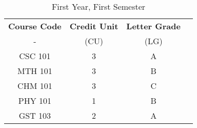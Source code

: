 \documentclass{article}
\begin{document}
	
	\begin{table}[h!]
		\begin{center}
			\caption{First Year, First Semester}
			\label{tab:table1}
			\begin{tabular}{c|c|c|c}
				\textbf{Course Code} & \textbf{Credit Unit} & 
				\textbf{Letter Grade}\\
				- & (CU) & (LG) \\
				\hline
				CSC 101 & 3 & A\\
			    MTH 101 & 3 & B\\
			    CHM 101 & 3 & C\\
			    PHY 101 & 1 & B\\
			    GST 103 & 2 & A\\
			    \end{tabular}
		    \end{center}
	    \end{table}
		
		
\end{document}
